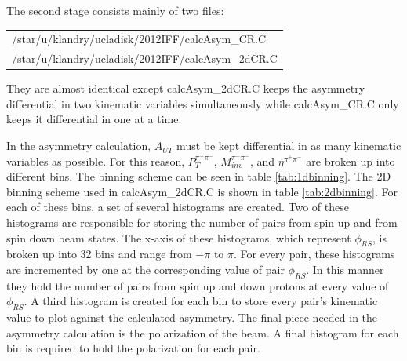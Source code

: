 \documentclass[abstract = on,listof=totoc, bibliography=totoc]{scrreprt}
\newcommand{\phirs}{\phi_{RS}}
\newcommand{\ptpair}{P_{T}^{\pi^+\pi^-}}
\newcommand{\mpair}{M_{inv}^{\pi^+\pi^-}}
\newcommand{\etapair}{\eta^{\pi^+\pi^-}}
\begin{document}
The second stage consists mainly of two files:
\begin{center}
\footnotesize
\begin{tabular}{l}
/star/u/klandry/ucladisk/2012IFF/calcAsym\_CR.C  \\
/star/u/klandry/ucladisk/2012IFF/calcAsym\_2dCR.C \\
\end{tabular}
\end{center}
They are almost identical except calcAsym\_2dCR.C keeps the asymmetry differential in two kinematic variables simultaneously while calcAsym\_CR.C only keeps it differential in one at a time. 

In the asymmetry calculation, $A_{UT}$ must be kept differential in as many kinematic variables as possible. For this reason, $\ptpair$, $\mpair$, and $\etapair$ are broken up into different bins. The binning scheme can be seen in table \ref{tab:1dbinning}. The 2D binning scheme used in calcAsym\_2dCR.C is shown in table \ref{tab:2dbinning}. For each of these bins, a set of several histograms are created. Two of these histograms are responsible for storing the number of pairs from spin up and from spin down beam states. The x-axis of these histograms, which represent $\phirs$, is broken up into 32 bins and range from $-\pi$ to $\pi$. For every pair, these histograms are incremented by one at the corresponding value of pair $\phirs$. In this manner they hold the number of pairs from spin up and down protons at every value of $\phirs$. A third histogram is created for each bin to store every pair's kinematic value to plot against the calculated asymmetry. The final piece needed in the asymmetry calculation is the polarization of the beam. A final histogram for each bin is required to hold the polarization for each pair. 
\end{document}
